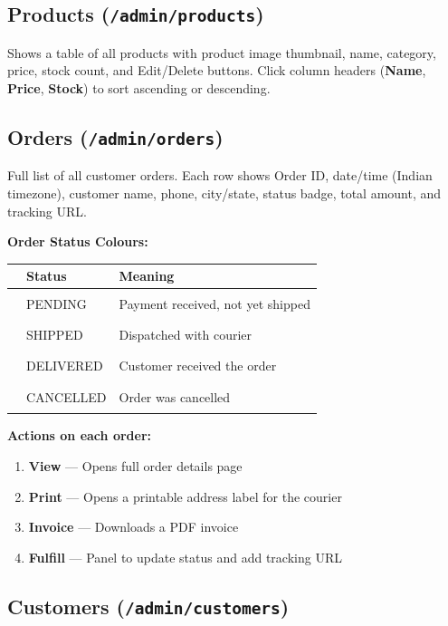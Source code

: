 \documentclass[12pt,a4paper]{article}
\begin{document}
\subsection{Products (\texttt{/admin/products})}

Shows a table of all products with product image thumbnail, name, category, price, stock count, and Edit/Delete buttons. Click column headers (\textbf{Name}, \textbf{Price}, \textbf{Stock}) to sort ascending or descending.

\subsection{Orders (\texttt{/admin/orders})}

Full list of all customer orders. Each row shows Order ID, date/time (Indian timezone), customer name, phone, city/state, status badge, total amount, and tracking URL.

\vspace{0.5em}
\textbf{Order Status Colours:}

\begin{tabular}{@{}L{1cm} L{3cm} L{8cm}@{}}
\toprule
& \textbf{Status} & \textbf{Meaning} \\
\midrule
\textcolor{warningyellow}{\rule{0.8em}{0.8em}} & PENDING & Payment received, not yet shipped \\
\textcolor{primary}{\rule{0.8em}{0.8em}} & SHIPPED & Dispatched with courier \\
\textcolor{successgreen}{\rule{0.8em}{0.8em}} & DELIVERED & Customer received the order \\
\textcolor{dangerred}{\rule{0.8em}{0.8em}} & CANCELLED & Order was cancelled \\
\bottomrule
\end{tabular}

\vspace{0.5em}
\textbf{Actions on each order:}
\begin{enumerate}[leftmargin=2em, itemsep=3pt]
  \item \textbf{View} — Opens full order details page
  \item \textbf{Print} — Opens a printable address label for the courier
  \item \textbf{Invoice} — Downloads a PDF invoice
  \item \textbf{Fulfill} — Panel to update status and add tracking URL
\end{enumerate}

\subsection{Customers (\texttt{/admin/customers})}
\end{document}
